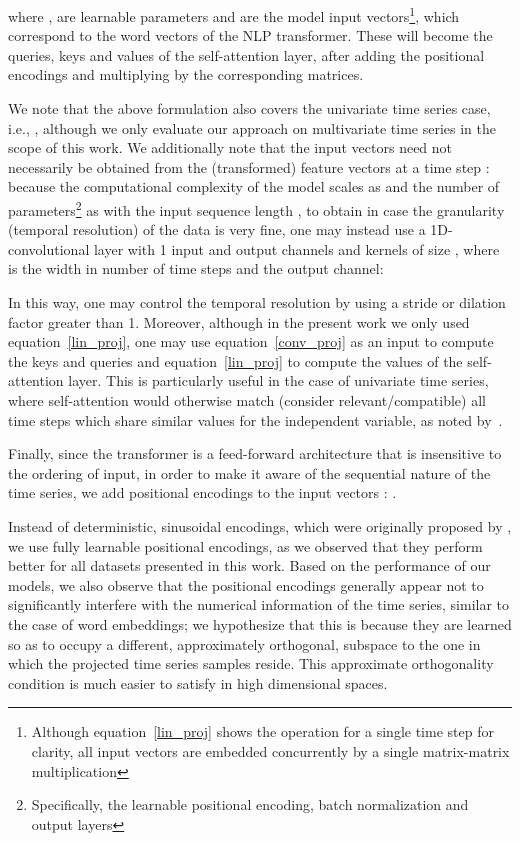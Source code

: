 \documentclass{article} \usepackage{iclr2021_conference,times}
\def\eqref#1{equation~\ref{#1}}
\begin{document}
\noindent where ,  are learnable parameters and  are the model input vectors\footnote{Although \eqref{lin_proj} shows the operation for a single time step for clarity, all input vectors are embedded concurrently by a single matrix-matrix multiplication}, which correspond to the word vectors of the NLP transformer.
These will become the queries, keys and values of the self-attention layer, after adding the positional encodings and multiplying by the corresponding matrices. 

We note that the above formulation also covers the univariate time series case, i.e., , although we only evaluate our approach on multivariate time series in the scope of this work. We additionally note that the input vectors  need not necessarily be obtained from the (transformed) feature vectors at a time step : because the computational complexity of the model scales as  and the number of parameters\footnote{Specifically, the learnable positional encoding, batch normalization and output layers} as  with the input sequence length ,  to obtain  in case the granularity (temporal resolution) of the data is very fine, one may instead use a 1D-convolutional layer with 1 input and  output channels and kernels  of size , where  is the width in number of time steps and  the output channel:



In this way, one may control the temporal resolution by using a stride or dilation factor greater than 1. Moreover, although in the present work we only used \eqref{lin_proj}, one may use \eqref{conv_proj} as an input to compute the keys and queries and \eqref{lin_proj} to compute the values of the self-attention layer. This is particularly useful in the case of univariate time series, where self-attention would otherwise match (consider relevant/compatible) all time steps which share similar values for the independent variable, as noted by~\citet{li2019enhancing}.

Finally, since the transformer is a feed-forward architecture that is insensitive to the ordering of input, in order to make it aware of the sequential nature of the time series, we add positional encodings  to the input vectors : .

Instead of deterministic, sinusoidal encodings, which were originally proposed by \cite{vaswani_attention_2017}, we use fully learnable positional encodings, as we observed that they perform better for all datasets presented in this work. Based on the performance of our models, we also observe that the positional encodings generally appear not to significantly interfere with the numerical information of the time series, similar to the case of word embeddings; we hypothesize that this is because they are learned so as to occupy a different, approximately orthogonal, subspace to the one in which the projected time series samples reside. This approximate orthogonality condition is much easier to satisfy in high dimensional spaces. 
\end{document}

